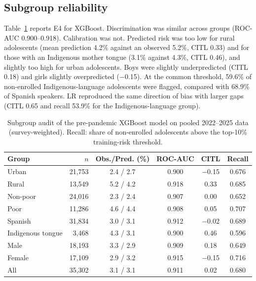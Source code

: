 \documentclass[conference]{IEEEtran}
\begin{document}
\subsection{Subgroup reliability}
Table~\ref{tab:sub} reports E4 for XGBoost. Discrimination was similar across groups (ROC-AUC 0.900--0.918). Calibration was not. Predicted risk was too low for rural adolescents (mean prediction 4.2\% against an observed 5.2\%, CITL 0.33) and for those with an Indigenous mother tongue (3.1\% against 4.3\%, CITL 0.46), and slightly too high for urban adolescents. Boys were slightly underpredicted (CITL 0.18) and girls slightly overpredicted ($-$0.15). At the common threshold, 59.6\% of non-enrolled Indigenous-language adolescents were flagged, compared with 68.9\% of Spanish speakers. LR reproduced the same direction of bias with larger gaps (CITL 0.65 and recall 53.9\% for the Indigenous-language group).

\begin{table}[t]
\caption{Subgroup audit of the pre-pandemic XGBoost model on pooled 2022--2025 data (survey-weighted). Recall: share of non-enrolled adolescents above the top-10\% training-risk threshold.}
\label{tab:sub}
\centering
\setlength{\tabcolsep}{3.5pt}
\footnotesize
\begin{tabular}{lrcccc}
\toprule
Group & $n$ & Obs./Pred. (\%) & ROC-AUC & CITL & Recall \\
\midrule
Urban & 21,753 & 2.4 / 2.7 & 0.900 & $-$0.15 & 0.676 \\
Rural & 13,549 & 5.2 / 4.2 & 0.918 & 0.33 & 0.685 \\
Non-poor & 24,016 & 2.3 / 2.4 & 0.907 & 0.00 & 0.652 \\
Poor & 11,286 & 4.6 / 4.4 & 0.908 & 0.05 & 0.707 \\
Spanish & 31,834 & 3.0 / 3.1 & 0.912 & $-$0.02 & 0.689 \\
Indigenous tongue & 3,468 & 4.3 / 3.1 & 0.900 & 0.46 & 0.596 \\
Male & 18,193 & 3.3 / 2.9 & 0.909 & 0.18 & 0.649 \\
Female & 17,109 & 2.9 / 3.2 & 0.915 & $-$0.15 & 0.716 \\
\midrule
All & 35,302 & 3.1 / 3.1 & 0.911 & 0.02 & 0.680 \\
\bottomrule
\end{tabular}
\end{table}
\end{document}

